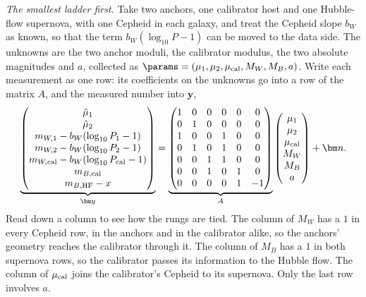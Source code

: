 \emph{The smallest ladder first.} Take two anchors, one calibrator host and one Hubble-flow supernova, with one Cepheid in each galaxy, and treat the Cepheid slope $b_W$ as known, so that the term $b_W(\log_{10}P-1)$ can be moved to the data side. The unknowns are the two anchor moduli, the calibrator modulus, the two absolute magnitudes and $a$, collected as $\params=(\mu_1,\mu_2,\mu_{\rm cal},M_W,M_B,a)$. Write each measurement as one row: its coefficients on the unknowns go into a row of the matrix $A$, and the measured number into $\bm y$,
\[
  \underbrace{\begin{pmatrix}
    \hat\mu_1\\ \hat\mu_2\\ m_{W,1}-b_W(\log_{10}P_1-1)\\ m_{W,2}-b_W(\log_{10}P_2-1)\\ m_{W,\rm cal}-b_W(\log_{10}P_{\rm cal}-1)\\ m_{B,\rm cal}\\ m_{B,\rm HF}-x
  \end{pmatrix}}_{\bm y}
  =
  \underbrace{\begin{pmatrix}
    1&0&0&0&0&0\\
    0&1&0&0&0&0\\
    1&0&0&1&0&0\\
    0&1&0&1&0&0\\
    0&0&1&1&0&0\\
    0&0&1&0&1&0\\
    0&0&0&0&1&-1
  \end{pmatrix}}_{A}
  \begin{pmatrix}\mu_1\\ \mu_2\\ \mu_{\rm cal}\\ M_W\\ M_B\\ a\end{pmatrix}
  +\bm n .
\]
Read down a column to see how the rungs are tied. The column of $M_W$ has a $1$ in every Cepheid row, in the anchors and in the calibrator alike, so the anchors' geometry reaches the calibrator through it. The column of $M_B$ has a $1$ in both supernova rows, so the calibrator passes its information to the Hubble flow. The column of $\mu_{\rm cal}$ joins the calibrator's Cepheid to its supernova. Only the last row involves $a$.

